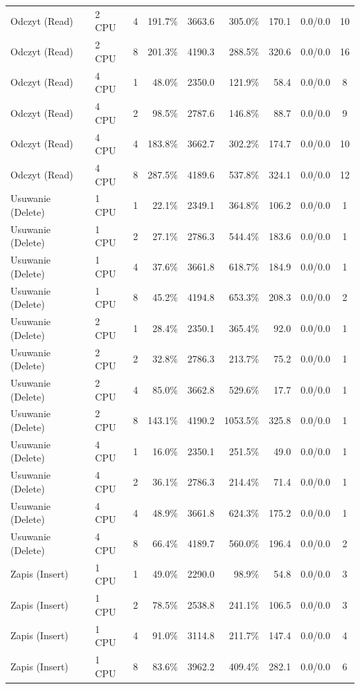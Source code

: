\begin{table}[ht]
{\begin{tabular}{llcrrrrcc}
Odczyt (Read) & 2 CPU & 4 & 191.7\% & 3663.6 & 305.0\% & 170.1 & 0.0/0.0 & 10 \\
Odczyt (Read) & 2 CPU & 8 & 201.3\% & 4190.3 & 288.5\% & 320.6 & 0.0/0.0 & 16 \\
Odczyt (Read) & 4 CPU & 1 & 48.0\% & 2350.0 & 121.9\% & 58.4 & 0.0/0.0 & 8 \\
Odczyt (Read) & 4 CPU & 2 & 98.5\% & 2787.6 & 146.8\% & 88.7 & 0.0/0.0 & 9 \\
Odczyt (Read) & 4 CPU & 4 & 183.8\% & 3662.7 & 302.2\% & 174.7 & 0.0/0.0 & 10 \\
Odczyt (Read) & 4 CPU & 8 & 287.5\% & 4189.6 & 537.8\% & 324.1 & 0.0/0.0 & 12 \\
Usuwanie (Delete) & 1 CPU & 1 & 22.1\% & 2349.1 & 364.8\% & 106.2 & 0.0/0.0 & 1 \\
Usuwanie (Delete) & 1 CPU & 2 & 27.1\% & 2786.3 & 544.4\% & 183.6 & 0.0/0.0 & 1 \\
Usuwanie (Delete) & 1 CPU & 4 & 37.6\% & 3661.8 & 618.7\% & 184.9 & 0.0/0.0 & 1 \\
Usuwanie (Delete) & 1 CPU & 8 & 45.2\% & 4194.8 & 653.3\% & 208.3 & 0.0/0.0 & 2 \\
Usuwanie (Delete) & 2 CPU & 1 & 28.4\% & 2350.1 & 365.4\% & 92.0 & 0.0/0.0 & 1 \\
Usuwanie (Delete) & 2 CPU & 2 & 32.8\% & 2786.3 & 213.7\% & 75.2 & 0.0/0.0 & 1 \\
Usuwanie (Delete) & 2 CPU & 4 & 85.0\% & 3662.8 & 529.6\% & 17.7 & 0.0/0.0 & 1 \\
Usuwanie (Delete) & 2 CPU & 8 & 143.1\% & 4190.2 & 1053.5\% & 325.8 & 0.0/0.0 & 1 \\
Usuwanie (Delete) & 4 CPU & 1 & 16.0\% & 2350.1 & 251.5\% & 49.0 & 0.0/0.0 & 1 \\
Usuwanie (Delete) & 4 CPU & 2 & 36.1\% & 2786.3 & 214.4\% & 71.4 & 0.0/0.0 & 1 \\
Usuwanie (Delete) & 4 CPU & 4 & 48.9\% & 3661.8 & 624.3\% & 175.2 & 0.0/0.0 & 1 \\
Usuwanie (Delete) & 4 CPU & 8 & 66.4\% & 4189.7 & 560.0\% & 196.4 & 0.0/0.0 & 2 \\
Zapis (Insert) & 1 CPU & 1 & 49.0\% & 2290.0 & 98.9\% & 54.8 & 0.0/0.0 & 3 \\
Zapis (Insert) & 1 CPU & 2 & 78.5\% & 2538.8 & 241.1\% & 106.5 & 0.0/0.0 & 3 \\
Zapis (Insert) & 1 CPU & 4 & 91.0\% & 3114.8 & 211.7\% & 147.4 & 0.0/0.0 & 4 \\
Zapis (Insert) & 1 CPU & 8 & 83.6\% & 3962.2 & 409.4\% & 282.1 & 0.0/0.0 & 6 \\

\end{tabular}}
\end{table}
